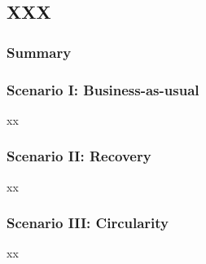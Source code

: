 \subsection{XXX}\label{subsec:XXX}


\subsubsection{Summary}


\clearpage

\subsubsection[Scenario I: Business-as-usual]{\iconBAU Scenario I: Business-as-usual}

xx \\


\wasteSubsubsubsecBATT

\wasteSubsubsubsecCDW

\wasteSubsubsubsecELV

\wasteSubsubsubsecMIN

\wasteSubsubsubsecSLASH

\wasteSubsubsubsecWEEE

\subsectionEndline
\clearpage

\subsubsection[Scenario II: Recovery]{\iconREC Scenario II: Recovery}

xx \\


\wasteSubsubsubsecBATT

\wasteSubsubsubsecCDW

\wasteSubsubsubsecELV

\wasteSubsubsubsecMIN

\wasteSubsubsubsecSLASH

\wasteSubsubsubsecWEEE

\subsectionEndline
\clearpage


\subsubsection[Scenario III: Circularity]{\iconCIR Scenario III: Circularity}

xx \\


\wasteSubsubsubsecBATT

\wasteSubsubsubsecCDW

\wasteSubsubsubsecELV

\wasteSubsubsubsecMIN

\wasteSubsubsubsecSLASH

\wasteSubsubsubsecWEEE

\sectionEndlines
\clearpage